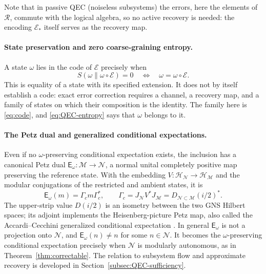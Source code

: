 \documentclass[a4paper,11pt]{article}
\theoremstyle{definition}
\newcommand{\mR}{\mathcal{R}}
\newcommand{\mN}{\mathcal{N}}
\newcommand{\mH}{\mathcal{H}}
\newcommand{\mM}{\mathcal{M}}
\newcommand{\mE}{\mathcal{E}}
\begin{document}
Note that in passive QEC (noiseless subsystems) the errors, here the elements of $\mR$, commute with the logical algebra, so no active recovery is needed: the encoding $\mE_*$ itself serves as the recovery map.

\paragraph{State preservation and zero coarse-graining entropy.}
A state $\omega$ lies in the code of $\mE$ precisely when
\begin{equation}
 S(\omega\|\omega\circ\mE)=0\quad\Longleftrightarrow\quad\omega=\omega\circ\mE .
 \label{eq:QEC-entropy}
\end{equation}
This is equality of a state with its specified extension. It does not by itself establish a code: exact error correction requires a channel, a recovery map, and a family of states on which their composition is the identity. The family here is \eqref{eq:code}, and \eqref{eq:QEC-entropy} says that $\omega$ belongs to it.

\paragraph{The Petz dual and generalized conditional expectations.}
Even if no $\omega$-preserving conditional expectation exists, the inclusion
has a canonical Petz dual $\mathsf E_\omega:\mM\to\mN$, a normal unital
completely positive map preserving the reference state. With the
embedding $V:\mH_{\mN}\to\mH_{\mM}$ and the modular conjugations of the
restricted and ambient states, it is
\begin{equation}
 \boxed{\quad
 \mathsf E_\omega(m)=\Gamma_c m\Gamma_c^*,\qquad
 \Gamma_c=J_{\mN}V^*J_{\mM}
 =D_{\mN\subset\mM}(i/2)^*.\quad}
 \label{eq:QEC-Petz-dual}
\end{equation}
The upper-strip value $D(i/2)$ is an isometry between the two GNS
Hilbert spaces; its adjoint implements the Heisenberg-picture Petz map,
also called the Accardi--Cecchini generalized conditional expectation
\cite{AccardiCecchini1982,Petz1988}. In general $\mathsf E_\omega$ is
not a projection onto $\mN$, and $\mathsf E_\omega(n)\ne n$ for some
$n\in\mN$. It becomes the $\omega$-preserving conditional expectation
precisely when $\mN$ is modularly autonomous, as in
Theorem~\ref{thm:correctable}. The relation to subsystem flow and
approximate recovery is developed in Section~\ref{subsec:QEC-sufficiency}.
\end{document}
